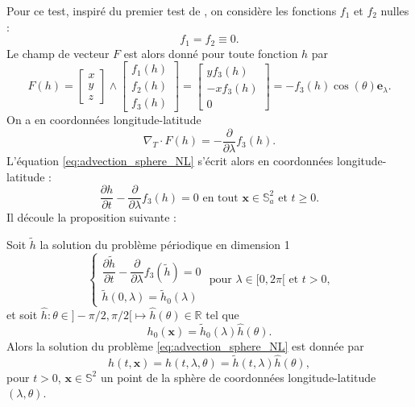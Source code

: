 Pour ce test, inspiré du premier test de \cite{BenArtzi2009}, on considère les fonctions $f_1$ et $f_2$ nulles :
\begin{equation}
f_1 = f_2 \equiv 0.
\end{equation}
Le champ de vecteur $F$ est alors donné pour toute fonction $h$ par
\begin{equation}
F(h) = \begin{bmatrix}
x \\ y \\z
\end{bmatrix}
\wedge
\begin{bmatrix}
f_1(h) \\ f_2(h) \\ f_3(h)
\end{bmatrix} = \begin{bmatrix}
y f_3 (h) \\ -x f_3(h) \\ 0
\end{bmatrix} = -f_3(h) \cos (\theta) \mathbf{e}_{\lambda}.
\end{equation}
On a en coordonnées longitude-latitude
\begin{equation}
\nabla_T \cdot F(h) = - \dfrac{\partial}{\partial \lambda} f_3(h).
\end{equation}
L'équation \eqref{eq:advection_sphere_NL} s'écrit alors en coordonnées longitude-latitude :
\begin{equation}
\dfrac{\partial h}{\partial t} - \dfrac{\partial}{\partial \lambda}f_3(h) = 0 \text{ en tout } \mathbf{x} \in \mathbb{S}^2_a \text{ et } t \geq 0.
\end{equation}
Il découle la proposition suivante :

\begin{proposition}
Soit $\tilde{h}$ la solution du problème périodique en dimension 1
\begin{equation}
\left\lbrace
\begin{array}{rcl}
\dfrac{\partial \tilde{h}}{\partial t} - \dfrac{\partial}{\partial \lambda}f_3(\tilde{h}) = 0 \\
\tilde{h}(0,\lambda) = \tilde{h}_0(\lambda) 
\end{array}
\right. \text{ pour } \lambda \in [0, 2 \pi[ \text{ et } t > 0,
\label{eq:conservation_sph_burgers}
\end{equation}
et soit $\hat{h} : \theta \in ]- \pi/2, \pi/2[ \mapsto \hat{h}(\theta) \in \mathbb{R}$ tel que
\begin{equation}
h_0(\mathbf{x}) = \tilde{h}_0(\lambda) \hat{h}(\theta).
\end{equation}
Alors la solution du problème \eqref{eq:advection_sphere_NL} est donnée par
\begin{equation}
h(t,\mathbf{x}) = h(t,\lambda, \theta) = \tilde{h}(t,\lambda) \hat{h}(\theta),
\end{equation}
pour $t>0$, $\mathbf{x} \in \mathbb{S}^2$ un point de la sphère de coordonnées longitude-latitude $(\lambda, \theta)$.
\end{proposition}


